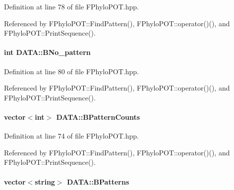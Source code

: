 \-Definition at line 78 of file \-F\-Phylo\-P\-O\-T.\-hpp.



\-Referenced by \-F\-Phylo\-P\-O\-T\-::\-Find\-Pattern(), \-F\-Phylo\-P\-O\-T\-::operator()(), and \-F\-Phylo\-P\-O\-T\-::\-Print\-Sequence().

\hypertarget{structDATA_a78e93d9dabc45d060155d164db458b3a}{
\paragraph[{\-B\-No\-\_\-pattern}]{\setlength{\rightskip}{0pt plus 5cm}int {\bf \-D\-A\-T\-A\-::\-B\-No\-\_\-pattern}}}\label{structDATA_a78e93d9dabc45d060155d164db458b3a}


\-Definition at line 80 of file \-F\-Phylo\-P\-O\-T.\-hpp.



\-Referenced by \-F\-Phylo\-P\-O\-T\-::\-Find\-Pattern(), \-F\-Phylo\-P\-O\-T\-::operator()(), and \-F\-Phylo\-P\-O\-T\-::\-Print\-Sequence().

\hypertarget{structDATA_a781e3ff29ee1a5d9bc8816a076b26819}{
\paragraph[{\-B\-Pattern\-Counts}]{\setlength{\rightskip}{0pt plus 5cm}vector$<$int$>$ {\bf \-D\-A\-T\-A\-::\-B\-Pattern\-Counts}}}\label{structDATA_a781e3ff29ee1a5d9bc8816a076b26819}


\-Definition at line 74 of file \-F\-Phylo\-P\-O\-T.\-hpp.



\-Referenced by \-F\-Phylo\-P\-O\-T\-::\-Find\-Pattern(), \-F\-Phylo\-P\-O\-T\-::operator()(), and \-F\-Phylo\-P\-O\-T\-::\-Print\-Sequence().

\hypertarget{structDATA_a1095aaedbb062c91c75a9dca7accc248}{
\paragraph[{\-B\-Patterns}]{\setlength{\rightskip}{0pt plus 5cm}vector$<$string$>$ {\bf \-D\-A\-T\-A\-::\-B\-Patterns}}}\label{structDATA_a1095aaedbb062c91c75a9dca7accc248}


